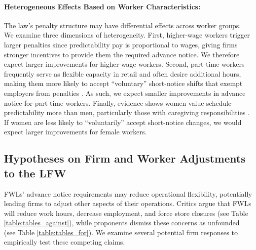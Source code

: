 \documentclass[letterpaper,11pt,leqno]{article}
\theoremstyle{paper}
\begin{document}
\paragraph{Heterogeneous Effects Based on Worker Characteristics:}
The law's penalty structure may have differential effects across worker groups. We examine three dimensions of heterogeneity. First, higher-wage workers trigger larger penalties since predictability pay is proportional to wages, giving firms stronger incentives to provide them the required advance notice. We therefore expect larger improvements for higher-wage workers. Second, part-time workers frequently serve as flexible capacity in retail and often desire additional hours, making them more likely to accept ``voluntary'' short-notice shifts that exempt employers from penalties \citep{lambert_2008,kalleberg2009precarious}. As such, we expect smaller improvements in advance notice for part-time workers. Finally, evidence shows women value schedule predictability more than men, particularly those with caregiving responsibilities \citep{mas2017valuing,wiswall2018preference}. If women are less likely to ``voluntarily'' accept short-notice changes, we would expect larger improvements for female workers.


\subsection{Hypotheses on Firm and Worker Adjustments to the LFW}

FWLs' advance notice requirements may reduce operational flexibility, potentially leading firms to adjust other aspects of their operations. Critics argue that FWLs will reduce work hours, decrease employment, and force store closures \citep{yelowitz_2022} (see Table \ref{table:tables_against}), while proponents dismiss these concerns as unfounded (see Table \ref{table:tables_for}). We examine several potential firm responses to empirically test these competing claims.
\end{document}
